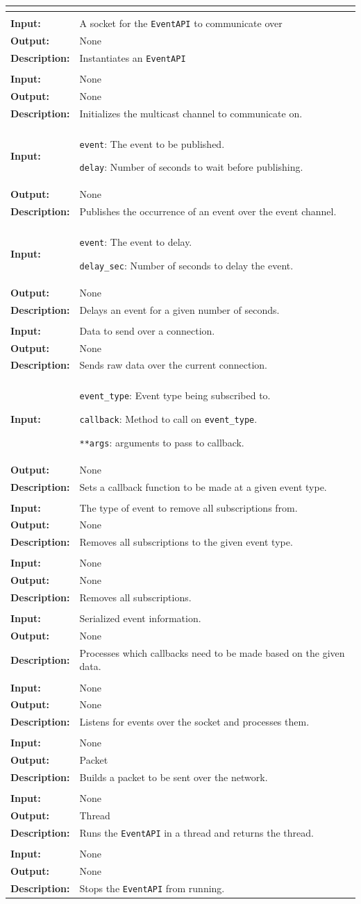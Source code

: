 \documentclass[titlepage]{article}
\renewenvironment{itemize*}
    {\begin{itemize}
        \setlength{\itemsep}{0pt}%
        \setlength{\parskip}{0pt}%
        \setlength{\partopsep}{0pt}%
        \setlength{\topsep}{0pt}}%
    {\end{itemize}}
\newcommand{\operations}[1]{
\begin{center}
    \begin{longtable}{|p{4cm}|p{10cm + 2.0\tabcolsep}|}
    \hline
    \multicolumn{2}{|l|}{\cellcolor[gray]{0.5}{\textbf{Operations}}} \\ \hline
#1
    \end{longtable}
\end{center}
}
\newcommand{\operation}[4]{
    \hline
    \multicolumn{2}{|l|}{\cellcolor[gray]{0.8}{\texttt{#1}}} \\ \hline
    \hspace{7pt}\textbf{Input:} & #2 \\ \hline
    \hspace{7pt}\textbf{Output:} & #3 \\ \hline
    \hspace{7pt}\textbf{Description:} & #4 \\ \hline
}
\begin{document}
\operations{
    \operation{\_\_init\_\_(tcp\_conn)}{A socket for the \texttt{EventAPI} to communicate over}{None}{Instantiates an \texttt{EventAPI}}
    \operation{\_setup\_mc()}{None}{None}{Initializes the multicast channel to communicate on.}
    \operation{publish(event,delay\_sec)}
    {
        \begin{itemize*}
            \item \texttt{event}: The event to be published. 
            \item \texttt{delay}: Number of seconds to wait before publishing. 
        \end{itemize*}
    }{None}{Publishes the occurrence of an event over the event channel.}
    \operation{\_delay(event, delay\_sec)}
    {
        \begin{itemize*}
            \item \texttt{event}: The event to delay.
            \item \texttt{delay\_sec}: Number of seconds to delay the event. 
        \end{itemize*}
    }{None}{Delays an event for a given number of seconds.}
    \operation{push\_raw(raw)}{Data to send over a connection.}{None}{Sends raw data over the current connection.}
    \operation{subscribe(event\_type, callback, **args)}
    {
        \begin{itemize*}
            \item \texttt{event\_type}: Event type being subscribed to. 
            \item \texttt{callback}: Method to call on \texttt{event\_type}.
            \item \texttt{**args}: arguments to pass to callback.
        \end{itemize*}
    }{None}{Sets a callback function to be made at a given event type.}
    \operation{unsubscribe\_all(event\_type)}{The type of event to remove all subscriptions from.}{None}{Removes all subscriptions to the given event type.}
    \operation{clear\_subscriptions()}{None}{None}{Removes all subscriptions.}
    \operation{\_process(data)}{Serialized event information.}{None}{Processes which callbacks need to be made based on the given data.}
    \operation{run()}{None}{None}{Listens for events over the socket and processes them.}
    \operation{\_tcp\_assemble()}{None}{Packet}{Builds a packet to be sent over the network.}
    \operation{start()}{None}{Thread}{Runs the \texttt{EventAPI} in a thread and returns the thread.}
    \operation{stop()}{None}{None}{Stops the \texttt{EventAPI} from running. }
}
    
\end{document}
